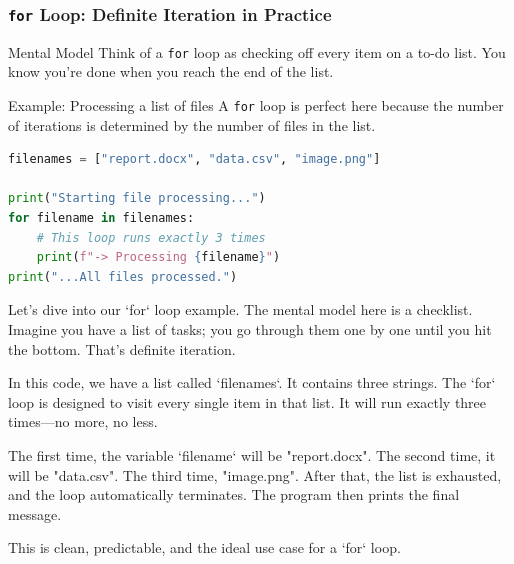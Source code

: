 \documentclass{beamer}
\begin{document}
\begin{frame}[fragile]
    \frametitle{\texttt{for} Loop: Definite Iteration in Practice}
    
    \begin{block}{Mental Model}
        Think of a \texttt{for} loop as checking off every item on a to-do list. You know you're done when you reach the end of the list.
    \end{block}

    \begin{exampleblock}{Example: Processing a list of files}
        A \texttt{for} loop is perfect here because the number of iterations is determined by the number of files in the list.
        
        \begin{lstlisting}[language=Python]
% Code Snippet
filenames = ["report.docx", "data.csv", "image.png"]

print("Starting file processing...")
for filename in filenames:
    # This loop runs exactly 3 times
    print(f"-> Processing {filename}")
print("...All files processed.")
        \end{lstlisting}
    \end{exampleblock}
    
    \begin{note}
    Let's dive into our `for` loop example. The mental model here is a checklist. Imagine you have a list of tasks; you go through them one by one until you hit the bottom. That's definite iteration.

    In this code, we have a list called `filenames`. It contains three strings. The `for` loop is designed to visit every single item in that list. It will run exactly three times—no more, no less.

    The first time, the variable `filename` will be "report.docx". The second time, it will be "data.csv". The third time, "image.png". After that, the list is exhausted, and the loop automatically terminates. The program then prints the final message.

    This is clean, predictable, and the ideal use case for a `for` loop.
    \end{note}
\end{frame}
\end{document}
